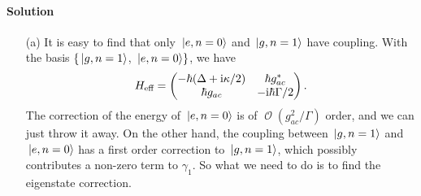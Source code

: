 \documentclass[hyperref, a4paper]{article}
\newcommand*{\ii}{\mathrm{i}}
\DeclareMathOperator{\bigO}{\mathcal{O}}
\begin{document}
\paragraph{Solution} \begin{itemize}
\item[(a)] It is easy to find that only $\ket*{e, n=0}$ and $\ket*{g, n=1}$ have coupling. With the basis 
$\{ \ket*{g, n=1}$, $\ket*{e, n=0} \}$, we have 
\begin{equation}
    H_\text{eff} = \pmqty{ - \hbar (\Delta + \ii \kappa / 2) & \hbar g_{ac}^* \\ \hbar g_{ac} & - \ii \hbar \Gamma / 2 }.
    \label{eq:heff-subspace-1}
\end{equation} 
The correction of the energy of $\ket*{e, n=0}$ is of $\bigO(g_{ac}^2 / \Gamma)$ order, and we can just throw 
it away. On the other hand, the coupling between $\ket*{g, n=1}$ and $\ket*{e, n=0}$ has a first order correction
to $\ket*{g, n=1}$, which possibly contributes a non-zero term to $\gamma_1$. So what we need to do is to find 
the eigenstate correction. 


\end{itemize}
\end{document}

